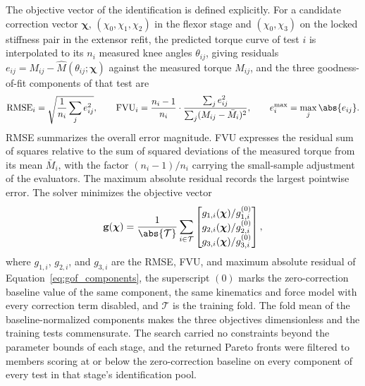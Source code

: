 The objective vector of the identification is defined explicitly. For a candidate correction vector $\boldsymbol{\chi}$, $(\chi_{0}, \chi_{1}, \chi_{2})$ in the flexor stage and $(\chi_{0}, \chi_{3})$ on the locked stiffness pair in the extensor refit, the predicted torque curve of test $i$ is interpolated to its $n_{i}$ measured knee angles $\theta_{ij}$, giving residuals $e_{ij} = M_{ij} - \hat{M}(\theta_{ij}; \boldsymbol{\chi})$ against the measured torque $M_{ij}$, and the three goodness-of-fit components of that test are
\begin{equation}
\mathrm{RMSE}_{i} = \sqrt{\frac{1}{n_{i}}\sum_{j} e_{ij}^{2}}, \qquad
\mathrm{FVU}_{i} = \frac{n_{i}-1}{n_{i}} \cdot \frac{\sum_{j} e_{ij}^{2}}{\sum_{j} (M_{ij} - \bar{M}_{i})^{2}}, \qquad
e^{\max}_{i} = \max_{j} \abs{e_{ij}}.
\label{eq:gof_components}
\end{equation}
RMSE summarizes the overall error magnitude. FVU expresses the residual sum of squares relative to the sum of squared deviations of the measured torque from its mean $\bar{M}_{i}$, with the factor $(n_{i}-1)/n_{i}$ carrying the small-sample adjustment of the evaluators. The maximum absolute residual records the largest pointwise error. The solver minimizes the objective vector
\begin{equation}
\mathbf{g}(\boldsymbol{\chi}) = \frac{1}{\abs{\mathcal{T}}} \sum_{i \in \mathcal{T}}
\begin{bmatrix}
g_{1,i}(\boldsymbol{\chi})/g_{1,i}^{(0)} \\
g_{2,i}(\boldsymbol{\chi})/g_{2,i}^{(0)} \\
g_{3,i}(\boldsymbol{\chi})/g_{3,i}^{(0)}
\end{bmatrix},
\label{eq:gof_objective}
\end{equation}
where $g_{1,i}$, $g_{2,i}$, and $g_{3,i}$ are the RMSE, FVU, and maximum absolute residual of Equation~\eqref{eq:gof_components}, the superscript $(0)$ marks the zero-correction baseline value of the same component, the same kinematics and force model with every correction term disabled, and $\mathcal{T}$ is the training fold. The fold mean of the baseline-normalized components makes the three objectives dimensionless and the training tests commensurate. The search carried no constraints beyond the parameter bounds of each stage, and the returned Pareto fronts were filtered to members scoring at or below the zero-correction baseline on every component of every test in that stage's identification pool.

